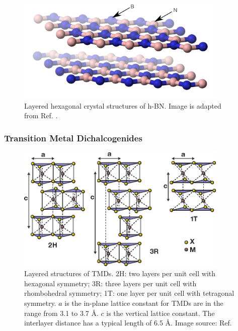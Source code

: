 \begin{figure}[htbp!] 
\centering  
\includegraphics[width=0.9\textwidth]{BN.png}
\caption[Layered hexagonal structures of h-BN]{Layered hexagonal crystal structures of h-BN. Image is adapted from Ref. \cite{Benjah2007}.}  
\label{fig:BN}
\end{figure} 


\subsubsection{Transition Metal Dichalcogenides}

\begin{figure}[htbp!] 
\centering  
\includegraphics[width=0.9\textwidth]{tmds.eps}
\caption[Layered structures of TMDs]{Layered structures of TMDs. 2H: two layers per unit cell with hexagonal symmetry; 3R: three layers per unit cell with rhombohedral symmetry; 1T: one layer per unit cell with tetragonal symmetry. $a$ is the in-plane lattice constant for TMDs are in the range from 3.1 to 3.7 \AA. $c$ is the vertical lattice constant. The interlayer distance has a typical length of 6.5 \AA. Image source: Ref. \cite{Wang2012}}  
\label{fig:tmds}
\end{figure} 

